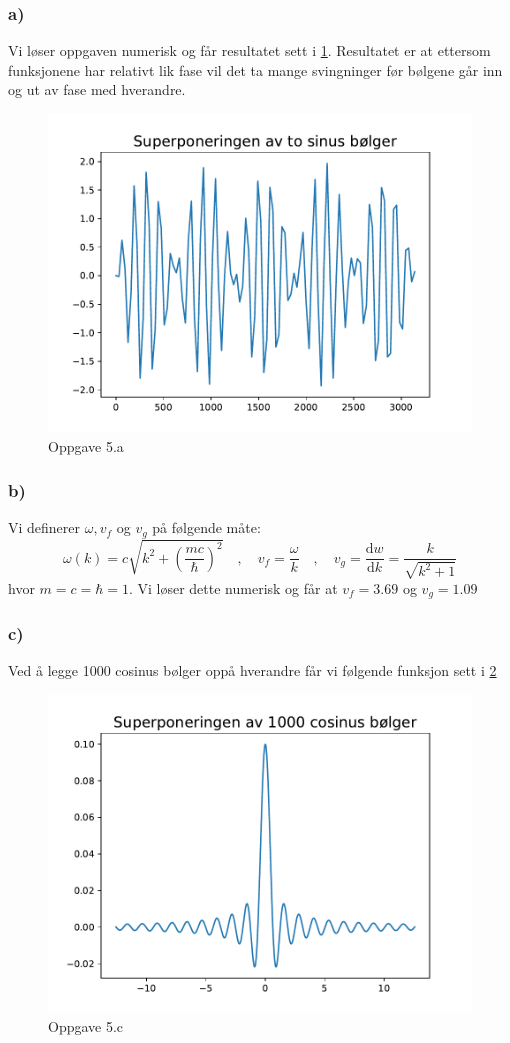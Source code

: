 \documentclass{article}
\begin{document}
\subsubsection*{a)}
Vi løser oppgaven numerisk og får resultatet sett i \ref{fig: 5a}. Resultatet er at ettersom funksjonene har relativt lik fase vil det ta mange svingninger før bølgene går inn og ut av fase med hverandre. 
\begin{figure}[h!]
  \centering
  \includegraphics[width = \textwidth]{fig/5a.pdf}
  \caption{Oppgave 5.a}
  \label{fig: 5a}
\end{figure}

\subsubsection*{b)}
Vi definerer $ω, v_f$ og $v_g$ på følgende måte: 
\[
ω(k) = c\sqrt{k^2 + \left( \frac{mc}{ℏ} \right) ^2} \quad , \quad v_f = \frac{ω}{k} \quad , \quad v_g = \frac{\mathrm{d}w}{\mathrm{d}k} = \frac{k}{\sqrt{k^2 + 1}}
\]
hvor $m = c = ℏ = 1$. Vi løser dette numerisk og får at $v_f = 3.69$ og $v_g = 1.09$
\subsubsection*{c)}  
Ved å legge 1000 cosinus bølger oppå hverandre får vi følgende funksjon sett i 
\ref{fig: 5c}
\begin{figure}[h!]
  \centering
  \includegraphics[width = \textwidth]{fig/5c.pdf}
  \caption{Oppgave 5.c}
  \label{fig: 5c}
\end{figure}
\end{document}
